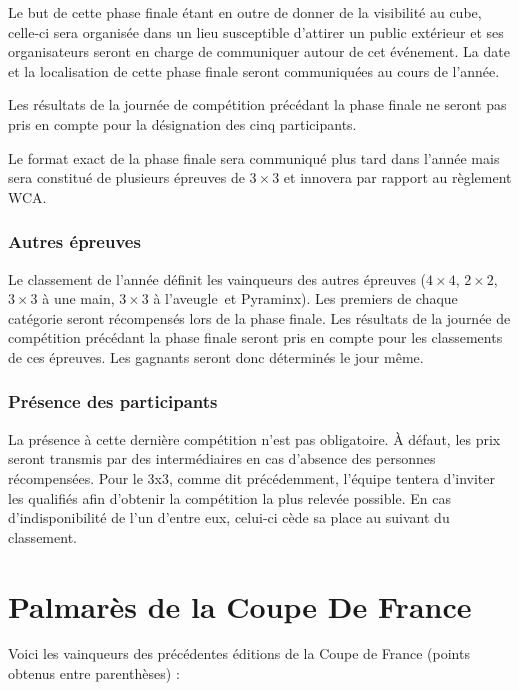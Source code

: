 \documentclass[10pt,a4paper]{article}
\newcommand{\3}{$3\times3$}
\newcommand{\4}{$4\times4$}
\newcommand{\2}{$2\times2$}
\newcommand{\oh}{$3\times3$ à une main}
\newcommand{\bld}{$3\times3$ à l'aveugle}
\newcommand{\pyra}{Pyraminx}
\begin{document}
Le but de cette phase finale étant en outre de donner de la visibilité au cube, celle-ci sera organisée dans un lieu susceptible d'attirer un public extérieur et ses organisateurs seront en charge de communiquer autour de cet événement. La date et la localisation de cette phase finale seront communiquées au cours de l'année.

Les résultats de la journée de compétition précédant la phase finale ne seront pas pris en compte pour la désignation des cinq participants.

Le format exact de la phase finale sera communiqué plus tard dans l'année mais sera constitué de plusieurs épreuves de \3 et innovera par rapport au règlement WCA.

\subsubsection{Autres épreuves}

Le classement de l'année définit les vainqueurs des autres épreuves (\4, \2, \oh, \bld\ et \pyra). Les premiers de chaque catégorie seront récompensés lors de la phase finale. Les résultats de la journée de compétition précédant la phase finale seront pris en compte pour les classements de ces épreuves. Les gagnants seront donc déterminés le jour même.

\subsubsection{Présence des participants}

La présence à cette dernière compétition n'est pas obligatoire. À défaut, les prix seront transmis par des intermédiaires en cas d'absence des personnes récompensées. Pour le 3x3, comme dit précédemment, l'équipe tentera d'inviter les qualifiés afin d'obtenir la compétition la plus relevée possible. En cas d'indisponibilité de l'un d'entre eux, celui-ci cède sa place au suivant du classement.

\section{Palmarès de la Coupe De France}

Voici les vainqueurs des précédentes éditions de la Coupe de France (points obtenus entre parenthèses) :
\end{document}

